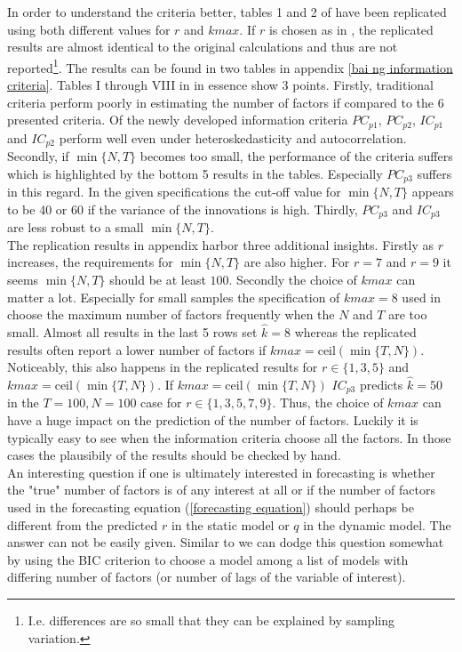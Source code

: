 \documentclass[12pt]{article}
\begin{document}
In order to understand the criteria better, tables 1 and 2 of \citet{bai2002determining} have been replicated using both different values for $r$ and $kmax$. If $r$ is chosen as in \citet{bai2002determining}, the replicated results are almost identical to the original calculations and thus are not reported\footnote{I.e. differences are so small that they can be explained by sampling variation.}. The results can be found in two tables in appendix \ref{bai ng information criteria}. Tables I through VIII in \citet{bai2002determining} in essence show $3$ points. Firstly, traditional criteria perform poorly in estimating the number of factors if compared to the $6$ presented criteria. Of the newly developed information criteria $PC_{p1}$, $PC_{p2}$, $IC_{p1}$ and $IC_{p2}$ perform well even under heteroskedasticity and autocorrelation. Secondly, if $\min\{N, T\}$ becomes too small, the performance of the criteria suffers which is highlighted by the bottom 5 results in the tables. Especially $PC_{p3}$ suffers in this regard. In the given specifications the cut-off value for $\min\{N, T\}$ appears to be 40 or 60 if the variance of the innovations is high. Thirdly, $PC_{p3}$ and $IC_{p3}$ are less robust to a small $\min\{N, T\}$. \\
The replication results in appendix \citet{bai2002determining} harbor three additional insights. Firstly as $r$ increases, the requirements for $\min\{N, T\}$ are also higher. For $r=7$ and $r=9$ it seems $\min\{N, T\}$ should be at least $100$. Secondly the choice of $kmax$ can matter a lot. Especially for small samples the specification of $kmax=8$ used in \citet{bai2002determining} choose the maximum number of factors frequently when the $N$ and $T$ are too small. Almost all results in the last 5 rows set $\hat k=8$ whereas the replicated results often report a lower number of factors if $kmax=\text{ceil}(\min\{T, N\})$. Noticeably, this also happens in the replicated results for $r \in \{1, 3, 5\}$ and $kmax=\text{ceil}(\min\{T, N\})$. If $kmax=\text{ceil}(\min\{T, N\})$ $IC_{p3}$ predicts $\hat k=50$ in the $T=100, N=100$ case for $r \in \{1, 3, 5, 7, 9\}$. Thus, the choice of $kmax$ can have a huge impact on the prediction of the number of factors. Luckily it is typically easy to see when the information criteria choose all the factors. In those cases the plausibily of the results should be checked by hand. \\

An interesting question if one is ultimately interested in forecasting is whether the "true" number of factors is of any interest at all or if the number of factors used in the forecasting equation (\ref{forecasting equation}) should perhaps be different from the predicted $r$ in the static model or $q$ in the dynamic model. The answer can not be easily given. Similar to \citet{bai2008forecasting} we can dodge this question somewhat by using the BIC criterion to choose a model among a list of models with differing number of factors (or number of lags of the variable of interest).
\end{document}
